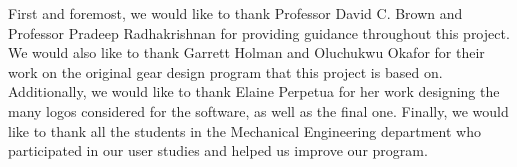 \begin{doublespace}

First and foremost, we would like to thank Professor David C. Brown and Professor Pradeep Radhakrishnan for providing guidance throughout this project. We would also like to thank Garrett Holman and Oluchukwu Okafor for their work on the original gear design program that this project is based on. Additionally, we would like to thank Elaine Perpetua for her work designing the many logos considered for the software, as well as the final one. Finally, we would like to thank all the students in the Mechanical Engineering department who participated in our user studies and helped us improve our program.

\end{doublespace}